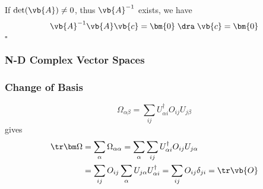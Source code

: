 \documentclass[a4paper]{article}
\begin{document}
If $ \det(\vb{A}) \neq 0 $, thus $ \vb{A}^{-1} $ exists, we have
\begin{equation}\label{key}
\vb{A}^{-1}\vb{A}\vb{c} = \bm{0} \;\dra\; \vb{c} = \bm{0}
\end{equation}
$  \square $

\subsubsection{N-D Complex Vector Spaces}

\subsubsection{Change of Basis}
\begin{equation}\label{key}
\Omega_{\alpha\beta} = \sum_{ij} U_{\alpha i}^\dagger O_{ij} U_{j\beta}
\end{equation}
gives
\begin{equation}\label{key}
\begin{aligned}
\tr\bm\Omega &= \sum_\alpha \Omega_{\alpha\alpha} = \sum_\alpha \sum_{ij} U_{\alpha i}^\dagger O_{ij} U_{j\alpha}\\
&= \sum_{ij} O_{ij} \sum_\alpha U_{j\alpha} U_{\alpha i}^\dagger = \sum_{ij} O_{ij} \delta_{ji} = \tr\vb{O}
\end{aligned}
\end{equation}
\end{document}
